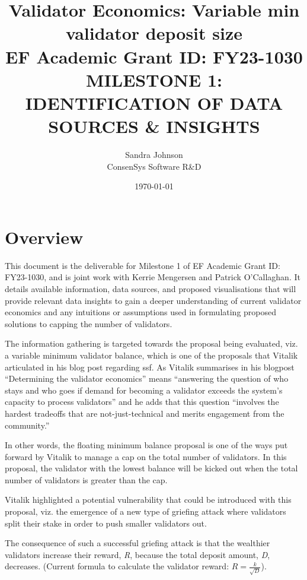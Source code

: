 \documentclass[UTF8]{article}
\title{Validator Economics: Variable min validator deposit size\\
\vspace{4pt}
\large EF Academic Grant ID: FY23-1030\\
\vspace{16pt}
MILESTONE 1: IDENTIFICATION OF DATA SOURCES \& INSIGHTS}
\author{Sandra Johnson\\
ConsenSys Software R\&D}
\date{\today}                                           %
\begin{document}
\maketitle



\section{Overview}
This document is the deliverable for Milestone 1 of EF Academic Grant ID: FY23-1030, and is joint work with Kerrie Mengersen and Patrick O'Callaghan. It details available information, data sources, and proposed visualisations that will provide relevant data insights to gain a deeper understanding of current validator economics and any intuitions or assumptions used in formulating proposed solutions to capping the number of validators.

The information gathering is targeted towards the proposal being evaluated, viz. a variable minimum validator balance, which is one of the proposals that Vitalik articulated in his blog post regarding \gls{ssf}.  As Vitalik summarises in his blogpost ``Determining the validator economics'' means ``answering the question of who stays and who goes if demand for becoming a validator exceeds the system's capacity to process validators'' and he adds that this question ``involves the hardest tradeoffs that are not-just-technical and merits engagement from the community.''

In other words, the floating minimum balance proposal is one of the ways put forward by Vitalik to manage a cap on the total number of validators. In this proposal, the validator with the lowest balance will be kicked out when the total number of validators is greater than the cap. 

Vitalik highlighted a potential vulnerability that could be introduced with this proposal, viz. the emergence of a new type of griefing attack \cite{Buterin2018c} where validators split their stake in order to push smaller validators out. 

The consequence of such a successful griefing attack is that the wealthier validators increase their reward, \textit{R}, because the total deposit amount, \textit{D}, decreases. (Current formula to calculate the validator reward: $R = \frac{k}{\sqrt{D}}$).
\end{document}
